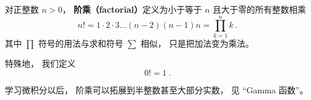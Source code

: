 
\begin{issues}
\issueDraft
\end{issues}

对正整数 $n > 0$， \textbf{阶乘（factorial）}定义为小于等于 $n$ 且大于零的所有整数相乘
\begin{equation}
n! = 1 \cdot 2 \cdot 3 \dots (n - 2) (n - 1)n = \prod_{k = 1}^n k~.
\end{equation}
其中 $\prod$ 符号的用法与求和符号 $\sum$ 相似， 只是把加法变为乘法。 %

特殊地， 我们定义
\begin{equation}
0! = 1~.
\end{equation}

学习微积分以后， 阶乘可以拓展到半整数甚至大部分实数， 见 “Gamma 函数”。
